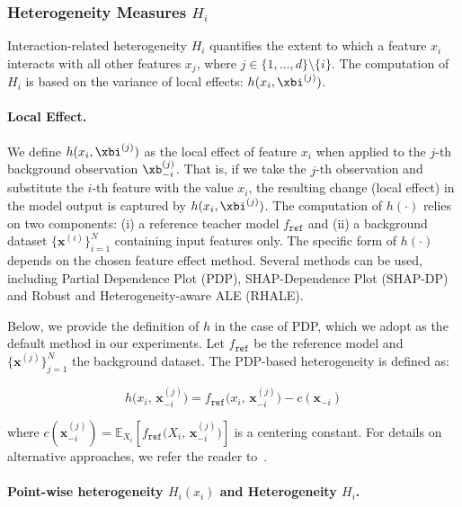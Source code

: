 \subsubsection{Heterogeneity Measures $H_i$}
\label{subsec:heterogeneity-measures}

Interaction-related heterogeneity $H_i$ quantifies the extent to which a feature $x_i$ interacts with all other features \(x_j\), where \(j \in \{1, \ldots, d\} \setminus \{i\}\).
The computation of $H_i$ is based on the variance of local effects: $h(x_i , \xbi^{(j)})$.

\paragraph{Local Effect.}
We define $h(x_i , \xbi^{(j)})$ as the local effect of feature $x_i$ when applied to the $j$-th background observation $\xb_{-i}^{(j)}$.
That is, if we take the $j$-th observation and substitute the $i$-th feature with the value $x_i$, the resulting change (local effect) in the model output is captured by $h(x_i , \xbi^{(j)})$.
The computation of $h(\cdot)$ relies on two components: (i) a reference teacher model $f_{\mathtt{ref}}$ and (ii) a background dataset $\{\mathbf{x}^{(i)}\}_{i=1}^N$ containing input features only. 
The specific form of $h(\cdot)$ depends on the chosen feature effect method.
Several methods can be used, including Partial Dependence Plot (PDP), SHAP-Dependence Plot (SHAP-DP) and Robust and Heterogeneity-aware ALE (RHALE).

Below, we provide the definition of $h$ in the case of PDP, which we adopt as the default method in our experiments.
Let \(f_{\mathtt{ref}}\) be the reference model and \(\{\mathbf{x}^{(j)}\}_{j=1}^N\) the background dataset. 
The PDP-based heterogeneity is defined as:

\begin{equation}
h\bigl(x_i,\,\mathbf{x}_{-i}^{(j)}\bigr) = 
f_{\mathtt{ref}}\bigl(x_i,\,\mathbf{x}_{-i}^{(j)}\bigr)
- c(\mathbf{x}_{-i})
\end{equation}

where $c(\mathbf{x}^{(j)}_{-i})= \mathbb{E}_{X_i} \left [ f_{\mathtt{ref}}\bigl(X_i,\,\mathbf{x}_{-i}^{(j)}\bigr) \right ]$ is a centering constant.
For details on alternative approaches, we refer the reader to~\cite{herbinger2024GADGET, herbinger2022REPID}.

\paragraph{Point-wise heterogeneity $H_i(x_i)$ and Heterogeneity $H_i$.}

